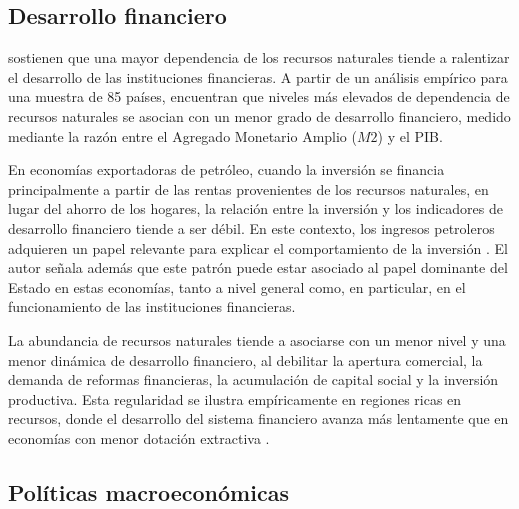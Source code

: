 \documentclass[../../TFM.tex]{subfiles}
\begin{document}
	\subsection{Desarrollo financiero}
	\label{subsec:desarrollo-financiero}
	
	\textcite{Gylfason2006} sostienen que una mayor dependencia de los recursos naturales tiende a ralentizar el desarrollo de las instituciones financieras. A partir de un análisis empírico para una muestra de 85 países, encuentran que niveles más elevados de dependencia de recursos naturales se asocian con un menor grado de desarrollo financiero, medido mediante la razón entre el Agregado Monetario Amplio ($M2$) y el PIB.
	
	En economías exportadoras de petróleo, cuando la inversión se financia principalmente a partir de las rentas provenientes de los recursos naturales, en lugar del ahorro de los hogares, la relación entre la inversión y los indicadores de desarrollo financiero tiende a ser débil. En este contexto, los ingresos petroleros adquieren un papel relevante para explicar el comportamiento de la inversión \parencite{Nili2007}. El autor señala además que este patrón puede estar asociado al papel dominante del Estado en estas economías, tanto a nivel general como, en particular, en el funcionamiento de las instituciones financieras.
	
	La abundancia de recursos naturales tiende a asociarse con un menor nivel y una menor dinámica de desarrollo financiero, al debilitar la apertura comercial, la demanda de reformas financieras, la acumulación de capital social y la inversión productiva. Esta regularidad se ilustra empíricamente en regiones ricas en recursos, donde el desarrollo del sistema financiero avanza más lentamente que en economías con menor dotación extractiva \parencite{Yuxiang2011}.
	
	\subsection{Políticas macroeconómicas}	
	\label{subsec:politicas-macroeconomicas}
	
\end{document}
